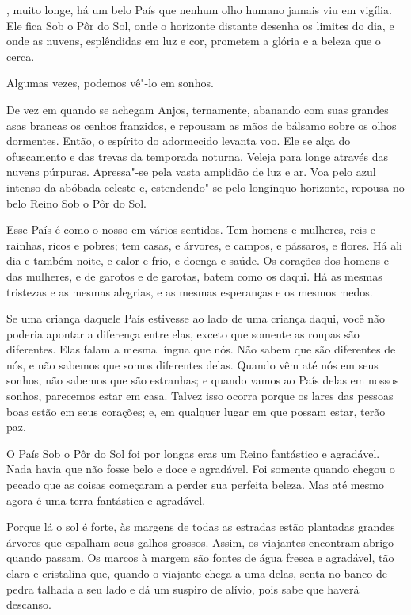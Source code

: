  

, muito longe, há um belo País que nenhum olho humano jamais viu
em vigília. Ele fica Sob o Pôr do Sol, onde o horizonte distante desenha
os limites do dia, e onde as nuvens, esplêndidas em luz e cor, prometem
a glória e a beleza que o cerca.

Algumas vezes, podemos vê"-lo em sonhos.

De vez em quando se achegam Anjos, ternamente, abanando com suas grandes
asas brancas os cenhos franzidos, e repousam as mãos de bálsamo sobre os
olhos dormentes. Então, o espírito do adormecido levanta voo. Ele se alça do
ofuscamento e das trevas da temporada noturna. Veleja para longe
através das nuvens púrpuras. Apressa"-se pela vasta amplidão de
luz e ar. Voa pelo azul intenso da abóbada celeste e, estendendo"-se pelo
longínquo horizonte, repousa no belo Reino Sob o Pôr do Sol.

Esse País é como o nosso em vários sentidos. Tem homens e mulheres,
reis e rainhas, ricos e pobres; tem casas, e árvores, e campos, e
pássaros, e flores. Há ali dia e também noite, e calor e frio, e doença
e saúde. Os corações dos homens e das mulheres, e de garotos e de garotas,
batem como os daqui. Há as mesmas tristezas e as mesmas alegrias, e as
mesmas esperanças e os mesmos medos.

Se uma criança daquele País estivesse ao lado de uma criança daqui, você
não poderia apontar a diferença entre elas, exceto que somente as roupas
são diferentes. Elas falam a mesma língua que nós. Não sabem que
são diferentes de nós, e não sabemos que somos diferentes delas. Quando
vêm até nós em seus sonhos, não sabemos que são estranhas; e quando
vamos ao País delas em nossos sonhos, parecemos estar em casa. Talvez
isso ocorra porque os lares das pessoas boas estão em seus corações; e,
em qualquer lugar em que possam estar, terão paz.

O País Sob o Pôr do Sol foi por longas eras um Reino fantástico e
agradável. Nada havia que não fosse belo e doce e agradável. Foi somente
quando chegou o pecado que as coisas começaram a perder sua perfeita
beleza. Mas até mesmo agora é uma terra fantástica e agradável.

Porque lá o sol é forte, às margens de todas as estradas estão plantadas
grandes árvores que espalham seus galhos grossos. Assim, os viajantes
encontram abrigo quando passam. Os marcos à margem são fontes de água fresca e
agradável, tão clara e cristalina que, quando o viajante chega a uma
delas, senta no banco de pedra talhada a seu lado e dá um suspiro de
alívio, pois sabe que haverá descanso.

